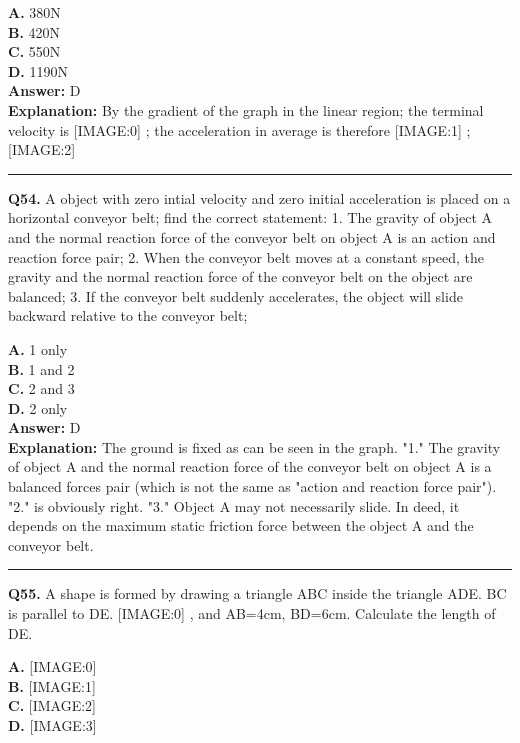 \documentclass[12pt]{article}
\begin{document}
\textbf{A.} 380N \\
\textbf{B.} 420N \\
\textbf{C.} 550N \\
\textbf{D.} 1190N \\

\textbf{Answer:} D \\
\textbf{Explanation:} By the gradient of the graph in the linear region; the terminal velocity is
[IMAGE:0]
; the acceleration in average is therefore
[IMAGE:1]
;
[IMAGE:2]

\hrule
\vspace{1em}


\noindent
\textbf{Q54.} A object with zero intial velocity and zero initial acceleration is placed on a horizontal conveyor belt; find the correct statement:
1.
The gravity of object A and the normal reaction force of the conveyor belt on object A is an action and reaction force pair;
2.
When the conveyor belt moves at a constant speed, the gravity and the normal reaction force of the conveyor belt on the object are balanced;
3.
If the conveyor belt suddenly accelerates, the object will slide backward relative to the conveyor belt;



\textbf{A.} 1 only \\
\textbf{B.} 1 and 2 \\
\textbf{C.} 2 and 3 \\
\textbf{D.} 2 only \\

\textbf{Answer:} D \\
\textbf{Explanation:} The ground is fixed as can be seen in the graph. "1." The gravity of object A and the normal reaction force of the conveyor belt on object A is a balanced forces pair (which is not the same as "action and reaction force pair"). "2." is obviously right. "3." Object A may not necessarily slide. In deed, it depends on the maximum static friction force between the object A and the conveyor belt.

\hrule
\vspace{1em}


\noindent
\textbf{Q55.} A shape is formed by drawing a triangle ABC inside the triangle ADE. BC is parallel to DE.
[IMAGE:0]
, and AB=4cm, BD=6cm.
Calculate the length of DE.



\textbf{A.} [IMAGE:0] \\
\textbf{B.} [IMAGE:1] \\
\textbf{C.} [IMAGE:2] \\
\textbf{D.} [IMAGE:3] \\
\end{document}
